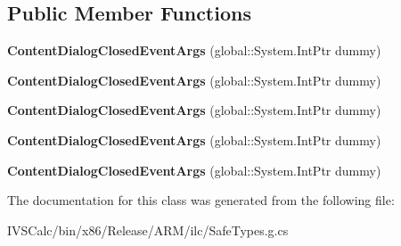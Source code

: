 \subsection*{Public Member Functions}
\begin{DoxyCompactItemize}
\item 
\mbox{\label{class_windows_1_1_u_i_1_1_xaml_1_1_controls_1_1_content_dialog_closed_event_args_ac2fd93710014ebdb72ccd9027036e239}} 
{\bfseries Content\+Dialog\+Closed\+Event\+Args} (global\+::\+System.\+Int\+Ptr dummy)
\item 
\mbox{\label{class_windows_1_1_u_i_1_1_xaml_1_1_controls_1_1_content_dialog_closed_event_args_ac2fd93710014ebdb72ccd9027036e239}} 
{\bfseries Content\+Dialog\+Closed\+Event\+Args} (global\+::\+System.\+Int\+Ptr dummy)
\item 
\mbox{\label{class_windows_1_1_u_i_1_1_xaml_1_1_controls_1_1_content_dialog_closed_event_args_ac2fd93710014ebdb72ccd9027036e239}} 
{\bfseries Content\+Dialog\+Closed\+Event\+Args} (global\+::\+System.\+Int\+Ptr dummy)
\item 
\mbox{\label{class_windows_1_1_u_i_1_1_xaml_1_1_controls_1_1_content_dialog_closed_event_args_ac2fd93710014ebdb72ccd9027036e239}} 
{\bfseries Content\+Dialog\+Closed\+Event\+Args} (global\+::\+System.\+Int\+Ptr dummy)
\item 
\mbox{\label{class_windows_1_1_u_i_1_1_xaml_1_1_controls_1_1_content_dialog_closed_event_args_ac2fd93710014ebdb72ccd9027036e239}} 
{\bfseries Content\+Dialog\+Closed\+Event\+Args} (global\+::\+System.\+Int\+Ptr dummy)
\end{DoxyCompactItemize}


The documentation for this class was generated from the following file\+:\begin{DoxyCompactItemize}
\item 
I\+V\+S\+Calc/bin/x86/\+Release/\+A\+R\+M/ilc/Safe\+Types.\+g.\+cs\end{DoxyCompactItemize}

